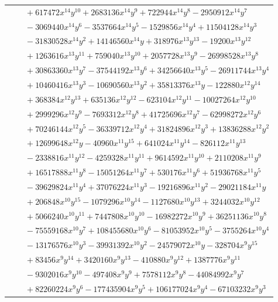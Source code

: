 \documentclass[11pt]{article}
\begin{document}
\begin{longtable}{@{}ll@{}}
 & $\quad +617472x^{14}y^{10}+2683136x^{14}y^{9}+722944x^{14}y^{8}-2950912x^{14}y^{7}$\\
 & $\quad -3069440x^{14}y^{6}-3537664x^{14}y^{5}-1529856x^{14}y^{4}+11504128x^{14}y^{3}$\\
 & $\quad -31830528x^{14}y^{2}+14146560x^{14}y+318976x^{13}y^{13}-19200x^{13}y^{12}$\\
 & $\quad +1263616x^{13}y^{11}+759040x^{13}y^{10}+2057728x^{13}y^{9}-26998528x^{13}y^{8}$\\
 & $\quad +30863360x^{13}y^{7}-37544192x^{13}y^{6}+34256640x^{13}y^{5}-26911744x^{13}y^{4}$\\
 & $\quad +10460416x^{13}y^{3}-10690560x^{13}y^{2}+35813376x^{13}y-122880x^{12}y^{14}$\\
 & $\quad +368384x^{12}y^{13}+635136x^{12}y^{12}-623104x^{12}y^{11}-10027264x^{12}y^{10}$\\
 & $\quad +2999296x^{12}y^{9}-7693312x^{12}y^{8}+41725696x^{12}y^{7}-62998272x^{12}y^{6}$\\
 & $\quad +70246144x^{12}y^{5}-36339712x^{12}y^{4}+31824896x^{12}y^{3}+13836288x^{12}y^{2}$\\
 & $\quad +12699648x^{12}y-40960x^{11}y^{15}+641024x^{11}y^{14}-826112x^{11}y^{13}$\\
 & $\quad -2338816x^{11}y^{12}-4259328x^{11}y^{11}+9614592x^{11}y^{10}+2110208x^{11}y^{9}$\\
 & $\quad +16517888x^{11}y^{8}-15051264x^{11}y^{7}+530176x^{11}y^{6}+51936768x^{11}y^{5}$\\
 & $\quad -39629824x^{11}y^{4}+37076224x^{11}y^{3}-19216896x^{11}y^{2}-29021184x^{11}y$\\
 & $\quad +206848x^{10}y^{15}-1079296x^{10}y^{14}-1127680x^{10}y^{13}+3244032x^{10}y^{12}$\\
 & $\quad +5066240x^{10}y^{11}+7447808x^{10}y^{10}-16982272x^{10}y^{9}+36251136x^{10}y^{8}$\\
 & $\quad -75559168x^{10}y^{7}+108455680x^{10}y^{6}-81053952x^{10}y^{5}-3755264x^{10}y^{4}$\\
 & $\quad -13176576x^{10}y^{3}-39931392x^{10}y^{2}-24579072x^{10}y-328704x^{9}y^{15}$\\
 & $\quad +83456x^{9}y^{14}+3420160x^{9}y^{13}-410880x^{9}y^{12}+1387776x^{9}y^{11}$\\
 & $\quad -9302016x^{9}y^{10}-497408x^{9}y^{9}+7578112x^{9}y^{8}-44084992x^{9}y^{7}$\\
 & $\quad +82260224x^{9}y^{6}-177435904x^{9}y^{5}+106177024x^{9}y^{4}-67103232x^{9}y^{3}$\\

\end{longtable}
\end{document}
